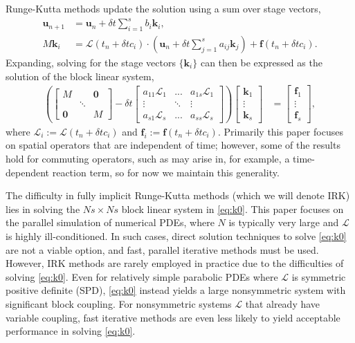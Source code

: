\documentclass[review]{siamart}
\begin{document}
Runge-Kutta methods update the solution using a sum over stage vectors,
%
\begin{align}\label{eq:update}
\mathbf{u}_{n+1} & = \mathbf{u}_n + \delta t \sum_{i=1}^s b_i\mathbf{k}_i, \\
M\mathbf{k}_i & = \mathcal{L}(t_n+\delta tc_i)\cdot
	\left(\mathbf{u}_n + \delta t\sum_{j=1}^s a_{ij}\mathbf{k}_j\right) +
	\mathbf{f}(t_n+\delta tc_i).\label{eq:stages}
\end{align}
%
Expanding, solving for the stage vectors $\{\mathbf{k}_i\}$ can then be expressed
as the solution of the block linear system,
%
\begin{align}\label{eq:k0}
\left( \begin{bmatrix} M  & & \mathbf{0} \\ & \ddots \\ \mathbf{0} & & M\end{bmatrix}
	- \delta t \begin{bmatrix} a_{11}\mathcal{L}_1 & ... & a_{1s}\mathcal{L}_1 \\
	\vdots & \ddots & \vdots \\ a_{s1}\mathcal{L}_s & ... & a_{ss} \mathcal{L}_s \end{bmatrix} \right)
	\begin{bmatrix} \mathbf{k}_1 \\ \vdots \\ \mathbf{k}_s \end{bmatrix}
& = \begin{bmatrix} \mathbf{f}_1 \\ \vdots \\ \mathbf{f}_s \end{bmatrix},
\end{align}
%
where $\mathcal{L}_i := \mathcal{L}(t_n+\delta tc_i)$ and $\mathbf{f}_i :=
\mathbf{f}(t_n+\delta tc_i)$. Primarily this paper
focuses on spatial operators that are independent of time; however, some of
the results hold for commuting operators, such as may arise in, for example,
a time-dependent reaction term, so for now we maintain this generality.

The difficulty in fully implicit Runge-Kutta methods (which we will denote IRK) lies in
solving the $Ns\times Ns$ block linear system in \eqref{eq:k0}. This paper focuses on the
parallel simulation of numerical PDEs, where $N$ is typically very large
and $\mathcal{L}$ is highly ill-conditioned. In such cases, direct
solution techniques to solve \eqref{eq:k0} are not a viable option, and fast, parallel
iterative methods must be used. However, IRK methods are rarely employed in practice due
to the difficulties of solving \eqref{eq:k0}. Even for relatively simple
parabolic PDEs where $\mathcal{L}$ is symmetric positive definite (SPD), \eqref{eq:k0}
instead yields a large nonsymmetric system with significant block coupling. For
nonsymmetric systems $\mathcal{L}$ that already have variable coupling, fast iterative
methods are even less likely to yield acceptable performance in solving \eqref{eq:k0}.
\end{document}
